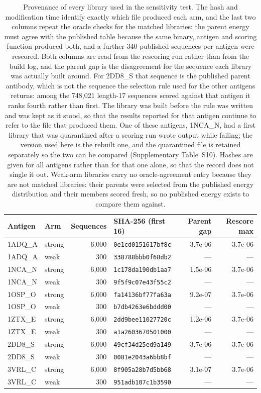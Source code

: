\documentclass[11pt,a4paper]{article}
\begin{document}
\begin{table}[h]
\caption{Provenance of every library used in the sensitivity test. The hash and modification time identify exactly which file produced each arm, and the last two columns repeat the oracle checks for the matched libraries: the parent energy must agree with the published table because the same binary, antigen and scoring function produced both, and a further 340 published sequences per antigen were rescored. Both columns are read from the rescoring run rather than from the build log, and the parent gap is the disagreement for the sequence each library was actually built around. For 2DD8\_S that sequence is the published parent antibody, which is not the sequence the selection rule used for the other antigens returns: among the 748{,}021 length-17 sequences scored against that antigen it ranks fourth rather than first. The library was built before the rule was written and was kept as it stood, so that the results reported for that antigen continue to refer to the file that produced them. One of these antigens, 1NCA\_N, had a first library that was quarantined after a scoring run wrote output while failing; the version used here is the rebuilt one, and the quarantined file is retained separately so the two can be compared (Supplementary Table~S10). Hashes are given for all antigens rather than for that one alone, so that the record does not single it out. Weak-arm libraries carry no oracle-agreement entry because they are not matched libraries: their parents were selected from the published energy distribution and their members scored fresh, so no published energy exists to compare them against.}
\centering
\begin{tabular}{@{}llrlrr@{}}
\toprule
Antigen & Arm & Sequences & SHA-256 (first 16) & Parent gap & Rescore max \\
\midrule
1ADQ\_A & strong & 6,000 & \texttt{0e1cd0151617bf8c} & 3.7e-06 & 3.7e-06 \\
1ADQ\_A & weak & 300 & \texttt{338788bbb0f68db2} & --- & --- \\
1NCA\_N & strong & 6,000 & \texttt{1c178da190db1aa7} & 1.5e-06 & 3.7e-06 \\
1NCA\_N & weak & 300 & \texttt{9f5f9c07e43f55c2} & --- & --- \\
1OSP\_O & strong & 6,000 & \texttt{fa14136bf77fa63a} & 9.2e-07 & 3.7e-06 \\
1OSP\_O & weak & 300 & \texttt{b7db4263e6bddd00} & --- & --- \\
1ZTX\_E & strong & 6,000 & \texttt{2dd9bee11027720c} & 1.2e-06 & 3.7e-06 \\
1ZTX\_E & weak & 300 & \texttt{a1a2603670501000} & --- & --- \\
2DD8\_S & strong & 6,000 & \texttt{49cf34d25ed9a149} & 3.7e-06 & 3.7e-06 \\
2DD8\_S & weak & 300 & \texttt{0081e2043a6bb8bf} & --- & --- \\
3VRL\_C & strong & 6,000 & \texttt{8f905a28b7d5bb68} & 3.1e-07 & 3.7e-06 \\
3VRL\_C & weak & 300 & \texttt{951adb107c1b3590} & --- & --- \\
\bottomrule
\end{tabular}
\end{table}
\end{document}
